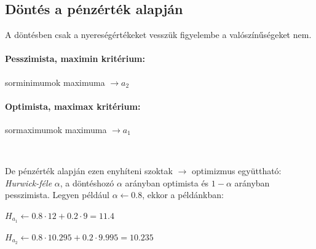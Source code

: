 \documentclass[a4paper,12pt]{article}
\begin{document}



\subsection{Döntés a pénzérték alapján}
\label{susec:penzert}
A döntésben csak a nyereségértékeket vesszük figyelembe a valószínűségeket nem.
\paragraph{Pesszimista, maximin kritérium:}  sorminimumok maximuma $\rightarrow a_2$
\paragraph{Optimista, maximax kritérium:}  sormaximumok maximuma $\rightarrow a_1$

\

De pénzérték alapján ezen enyhíteni szoktak $\rightarrow$ optimizmus együttható: \emph{Hurwick-féle} $\alpha$, a döntéshozó $\alpha$ arányban optimista és $1-\alpha$ arányban pesszimista. Legyen például $\alpha \gets 0.8$, ekkor a példánkban: 
\begin{center}
$H_{a_1} \gets 0.8\cdot 12 + 0.2\cdot 9 = 11.4$

$H_{a_2} \gets 0.8\cdot 10.295 + 0.2\cdot 9.995 = 10.235$
\end{center}
\end{document}
